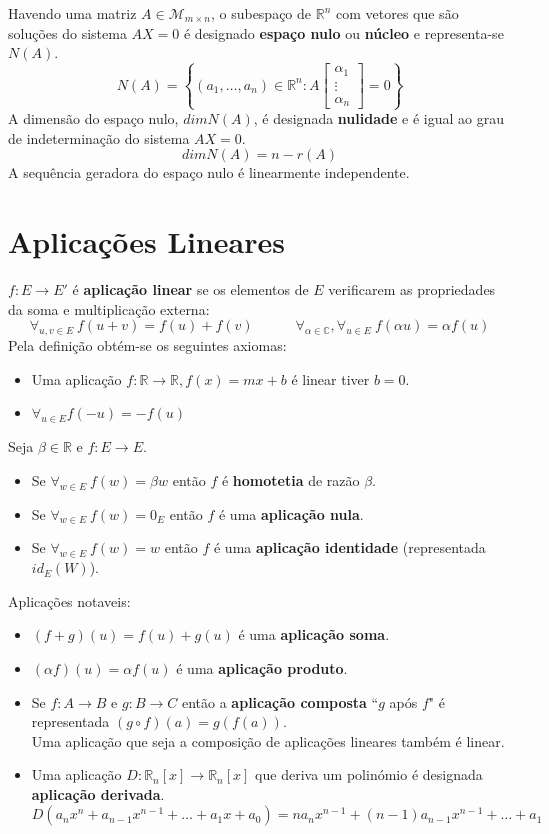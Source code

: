 \documentclass[]{report}
\begin{document}
Havendo uma matriz $A \in \mathcal{M}_{m \times n}$, o subespaço de $\mathbb{R}^n$ com vetores que são soluções do sistema $AX=0$ é designado \textbf{espaço nulo} ou \textbf{núcleo} e representa-se $N(A)$.
$$N(A) = \left\lbrace
(a_1, \dots, a_n) \in \mathbb{R}^n :
A \begin{bmatrix}
\alpha_1 \\ \vdots \\ \alpha_n
\end{bmatrix} = 0
\right\rbrace$$
A dimensão do espaço nulo, $dim N(A)$, é designada \textbf{nulidade} e é igual ao grau de indeterminação do sistema $AX=0$.
$$dim N(A) = n - r(A)$$
A sequência geradora do espaço nulo é linearmente independente.
\section{Aplicações Lineares}
$f:E \to E'$ é \textbf{aplicação linear} se os elementos de $E$ verificarem as propriedades da soma e multiplicação externa:
$$\forall_{u,v \in E} \> f(u+v) = f(u) + f(v) \quad \quad \quad
\forall_{\alpha \in \mathbb{C}}, \forall_{u \in E} \> f(\alpha u) = \alpha f(u)$$
Pela definição obtém-se os seguintes axiomas:
\begin{itemize}
\item Uma aplicação $f: \mathbb{R} \to \mathbb{R}, f(x) = mx + b$ é linear tiver $b=0$.
\item $\forall_{u \in E} f(-u) = -f(u)$
\end{itemize}
\vspace{2mm}
Seja $\beta \in \mathbb{R}$ e $f:E \to E$.
\begin{itemize}
\item Se $\forall_{w \in E} \> f(w) = \beta w$ então $f$ é \textbf{homotetia} de razão $\beta$.
\item Se $\forall_{w \in E} \> f(w) = 0_E$ então $f$ é uma \textbf{aplicação nula}.
\item Se $\forall_{w \in E} \> f(w) = w$ então $f$ é uma \textbf{aplicação identidade} (representada $id_E(W)$).
\end{itemize}
Aplicações notaveis:
\begin{itemize}
\item $(f+g)(u) = f(u)+g(u)$ é uma \textbf{aplicação soma}.
\item $(\alpha f)(u) = \alpha f(u)$ é uma \textbf{aplicação produto}.
\item Se $f:A \to B$ e $g:B \to C$ então a \textbf{aplicação composta} ``$g$ após $f$" é representada $(g \circ f)(a) = g(f(a))$.\\
Uma aplicação que seja a composição de aplicações lineares também é linear.
\item Uma aplicação $D: \mathbb{R}_n[x] \to \mathbb{R}_n[x]$ que deriva um polinómio é designada \textbf{aplicação derivada}.\\
$D(a_n x^n + a_{n-1}x^{n-1} + \dots + a_1 x + a_0) = na_n x^{n-1} + (n-1) a_{n-1} x^{n-1} + \dots + a_1$
\end{itemize}
\end{document}
